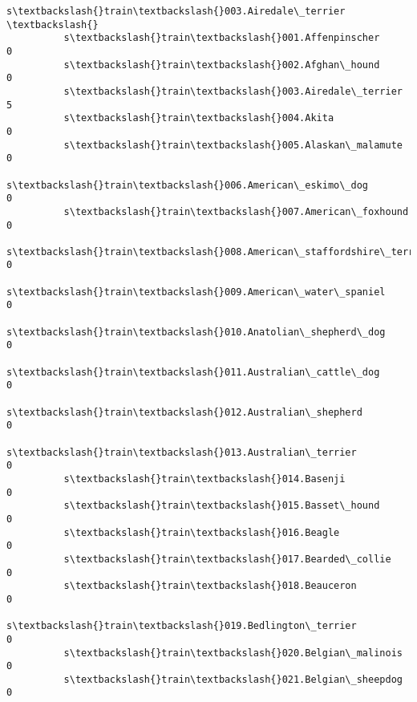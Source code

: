 \documentclass[11pt]{article}
\begin{document}
\begin{Verbatim}[commandchars=\\\{\}]
                                                          s\textbackslash{}train\textbackslash{}003.Airedale\_terrier  \textbackslash{}
          s\textbackslash{}train\textbackslash{}001.Affenpinscher                                                  0   
          s\textbackslash{}train\textbackslash{}002.Afghan\_hound                                                   0   
          s\textbackslash{}train\textbackslash{}003.Airedale\_terrier                                               5   
          s\textbackslash{}train\textbackslash{}004.Akita                                                          0   
          s\textbackslash{}train\textbackslash{}005.Alaskan\_malamute                                               0   
          s\textbackslash{}train\textbackslash{}006.American\_eskimo\_dog                                            0   
          s\textbackslash{}train\textbackslash{}007.American\_foxhound                                              0   
          s\textbackslash{}train\textbackslash{}008.American\_staffordshire\_terrier                                 0   
          s\textbackslash{}train\textbackslash{}009.American\_water\_spaniel                                         0   
          s\textbackslash{}train\textbackslash{}010.Anatolian\_shepherd\_dog                                         0   
          s\textbackslash{}train\textbackslash{}011.Australian\_cattle\_dog                                          0   
          s\textbackslash{}train\textbackslash{}012.Australian\_shepherd                                            0   
          s\textbackslash{}train\textbackslash{}013.Australian\_terrier                                             0   
          s\textbackslash{}train\textbackslash{}014.Basenji                                                        0   
          s\textbackslash{}train\textbackslash{}015.Basset\_hound                                                   0   
          s\textbackslash{}train\textbackslash{}016.Beagle                                                         0   
          s\textbackslash{}train\textbackslash{}017.Bearded\_collie                                                 0   
          s\textbackslash{}train\textbackslash{}018.Beauceron                                                      0   
          s\textbackslash{}train\textbackslash{}019.Bedlington\_terrier                                             0   
          s\textbackslash{}train\textbackslash{}020.Belgian\_malinois                                               0   
          s\textbackslash{}train\textbackslash{}021.Belgian\_sheepdog                                               0   

\end{Verbatim}
\end{document}
